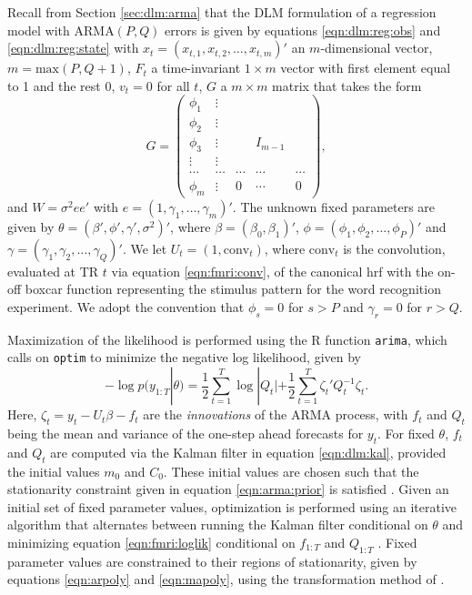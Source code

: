 Recall from Section \ref{sec:dlm:arma} that the DLM formulation of a regression model with $\mbox{ARMA}(P,Q)$ errors is given by equations \eqref{eqn:dlm:reg:obs} and \eqref{eqn:dlm:reg:state} with $x_t = (x_{t,1} ,x_{t,2}, \ldots, x_{t,m})'$ an $m$-dimensional vector, $m = \mbox{max}(P,Q+1)$, $F_t$ a time-invariant $1 \times m$ vector with first element equal to 1 and the rest 0, $v_t = 0$ for all $t$, $G$ a $m \times m$ matrix that takes the form
\[
G = \left(
 \begin{array}{ccccc}
 \phi_1 & \vdots \\
 \phi_2 & \vdots \\
 \phi_3 & \vdots && I_{m-1} \\
 \vdots & \vdots \\
 \cdots & \cdots & \cdots & \cdots & \cdots \\
 \phi_m &\vdots & 0 & \cdots & 0
 \end{array}
\right),
\]
and $W = \sigma^2ee'$ with $e = (1, \gamma_1, \ldots, \gamma_m)'$. The unknown fixed parameters are given by $\theta = (\beta', \phi', \gamma', \sigma^2)'$, where $\beta = (\beta_0,\beta_1)'$, $\phi = (\phi_1,\phi_2,\ldots,\phi_P)'$ and $\gamma = (\gamma_1,\gamma_2,\ldots,\gamma_Q)'$. We let $U_t = (1,\mbox{conv}_t)$, where $\mbox{conv}_t$ is the convolution, evaluated at TR $t$ via equation \eqref{eqn:fmri:conv}, of the canonical hrf with the on-off boxcar function representing the stimulus pattern for the word recognition experiment. We adopt the convention that $\phi_s = 0$ for $s > P$ and $\gamma_r = 0$ for $r > Q$.

Maximization of the likelihood is performed using the R function {\tt arima}, which calls on {\tt optim} to minimize the negative log likelihood, given by
\begin{equation}
-\log p(y_{1:T}|\theta) = \frac{1}{2}\sum_{t=1}^T \log|Q_t| + \frac{1}{2}\sum_{t=1}^T \zeta_t' Q_t^{-1} \zeta_t. \label{eqn:fmri:loglik}
\end{equation}
Here, $\zeta_t = y_t - U_t\beta - f_t$ are the \emph{innovations} of the ARMA process, with $f_t$ and $Q_t$ being the mean and variance of the one-step ahead forecasts for $y_t$. For fixed $\theta$, $f_t$ and $Q_t$ are computed via the Kalman filter in equation \eqref{eqn:dlm:kal}, provided the initial values $m_0$ and $C_0$. These initial values are chosen such that the stationarity constraint given in equation \eqref{eqn:arma:prior} is satisfied \citep{gardner:harvey:mlearma:1980}. Given an initial set of fixed parameter values, optimization is performed using an iterative algorithm that alternates between running the Kalman filter conditional on $\theta$ and minimizing equation \eqref{eqn:fmri:loglik} conditional on $f_{1:T}$ and $Q_{1:T}$ \citep{durbin:koopman:timeseries:2012,shum:stof:2006:timeseries}. Fixed parameter values are constrained to their regions of stationarity, given by equations \eqref{eqn:arpoly} and \eqref{eqn:mapoly}, using the transformation method of \citet{jones:arma:1980}.

